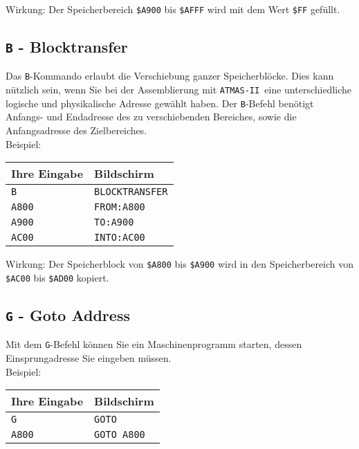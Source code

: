 \documentclass[10pt,a4paper,twoside,final,openright,titlepage]{memoir}
\def\atmas{\texttt{AT\-MAS-II }}
\begin{document}
Wirkung: Der Speicherbereich \texttt{\$A900} bis \texttt{\$AFFF} wird mit
dem Wert \texttt{\$FF} gefüllt.

\subsection{\texttt{B} - Blocktransfer}

Das \texttt{B}-Kommando erlaubt die Verschiebung ganzer
Speicherblöcke. Dies kann nützlich sein, wenn Sie bei
der Assemblierung mit \atmas eine unterschiedliche
logische und physikalische Adresse gewählt haben. Der
\texttt{B}-Befehl benötigt Anfangs- und Endadresse des zu verschiebenden Bereiches, sowie die Anfangsadresse des
Zielbereiches.\\

Beispiel: \\

\renewcommand{\arraystretch}{1.2}
\begin{tabular}{p{10em}p{10em}}
Ihre Eingabe	& Bildschirm \\ \hline
\texttt{B}		& \texttt{BLOCKTRANSFER} \\
\texttt{A800}	& \texttt{FROM:A800} \\
\texttt{A900}	& \texttt{TO:A900} \\
\texttt{AC00}	& \texttt{INTO:AC00} \\
\end{tabular}
\renewcommand{\arraystretch}{1.8}
\bigskip

Wirkung: Der Speicherblock von \texttt{\$A800} bis \texttt{\$A900} wird in
den Speicherbereich von \texttt{\$AC00} bis \texttt{\$AD00} kopiert.

\subsection{\texttt{G} - Goto Address}

Mit dem \texttt{G}-Befehl können Sie ein Maschinenprogramm
starten, dessen Einsprungadresse Sie eingeben müssen.\\

Beispiel: \\

\renewcommand{\arraystretch}{1.2}
\begin{tabular}{p{10em}p{10em}}
Ihre Eingabe	& Bildschirm \\ \hline
\texttt{G}		& \texttt{GOTO} \\
\texttt{A800}	& \texttt{GOTO A800} \\
\end{tabular}
\renewcommand{\arraystretch}{1.8}
\bigskip
\end{document}
